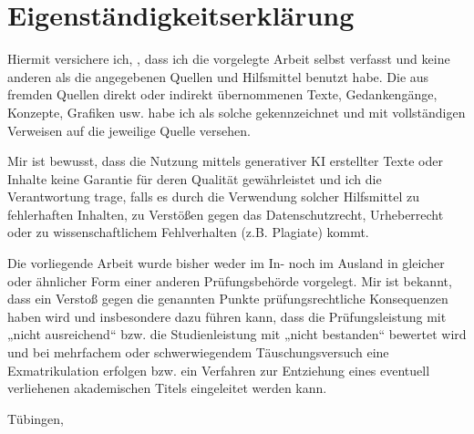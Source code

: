 \section{Eigenständigkeitserklärung}

Hiermit versichere ich, \authorname, dass ich die vorgelegte Arbeit selbst verfasst und keine anderen als die angegebenen Quellen und Hilfsmittel benutzt habe. Die aus fremden Quellen direkt oder indirekt übernommenen Texte, Gedankengänge, Konzepte, Grafiken usw. habe ich als solche gekennzeichnet und mit vollständigen Verweisen auf die jeweilige Quelle versehen. 

Mir ist bewusst, dass die Nutzung mittels generativer KI erstellter Texte oder Inhalte keine
Garantie für deren Qualität gewährleistet und ich die Verantwortung trage, falls es durch
die Verwendung solcher Hilfsmittel zu fehlerhaften Inhalten, zu Verstößen gegen das
Datenschutzrecht, Urheberrecht oder zu wissenschaftlichem Fehlverhalten (z.B. Plagiate)
kommt. 

Die vorliegende Arbeit wurde bisher weder im In- noch im Ausland in gleicher oder ähnlicher Form einer anderen 
Prüfungsbehörde vorgelegt. Mir ist bekannt, dass ein Verstoß gegen die genannten Punkte prüfungsrechtliche Konsequenzen 
haben wird und insbesondere dazu führen kann, dass die Prüfungsleistung mit „nicht ausreichend“ bzw. die Studienleistung 
mit „nicht bestanden“ bewertet wird und bei mehrfachem oder schwerwiegendem Täuschungsversuch eine Exmatrikulation 
erfolgen bzw. ein Verfahren zur Entziehung eines eventuell verliehenen akademischen Titels eingeleitet werden kann.

\vspace{1cm}
Tübingen, \wrdate
